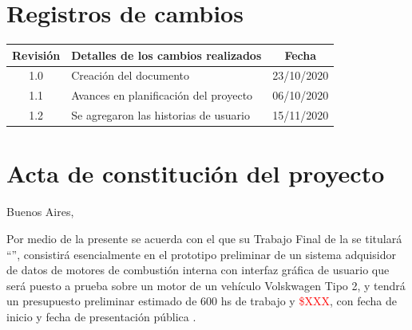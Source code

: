 \documentclass[11pt]{charter}
\begin{document}
\maketitle
\thispagestyle{empty}
\pagebreak


\thispagestyle{empty}
{\setlength{\parskip}{0pt}
\tableofcontents{}
}
\pagebreak


\section{Registros de cambios}
\label{sec:registro}


\begin{table}[ht]
\label{tab:registro}
\centering
\begin{tabularx}{\linewidth}{@{}|c|X|c|@{}}
\hline
\rowcolor[HTML]{C0C0C0} 
Revisión & \multicolumn{1}{c|}{\cellcolor[HTML]{C0C0C0}Detalles de los cambios realizados} & Fecha      \\ \hline
1.0      & Creación del documento                                          & 23/10/2020 \\ \hline
1.1      & Avances en planificación del proyecto                           & 06/10/2020 \\ \hline
1.2      & Se agregaron las historias de usuario							 & 15/11/2020 \\ \hline
\end{tabularx}
\end{table}

\pagebreak



\section{Acta de constitución del proyecto}
\label{sec:acta}

\begin{flushright}
Buenos Aires, \fechaInicioName
\end{flushright}

\vspace{2cm}

Por medio de la presente se acuerda con el \authorname\hspace{1px} que su Trabajo Final de la \degreename\hspace{1px} se titulará ``\ttitle'', consistirá esencialmente en el prototipo preliminar de un sistema adquisidor de datos de motores de combustión interna con interfaz gráfica de usuario que será puesto a prueba sobre un motor de un vehículo Volskwagen Tipo 2, y tendrá un presupuesto preliminar estimado de 600 hs de trabajo y \textcolor{red}{\$XXX}, con fecha de inicio \fechaInicioName\hspace{1px} y fecha de presentación pública \fechaFinalName.
\end{document}
